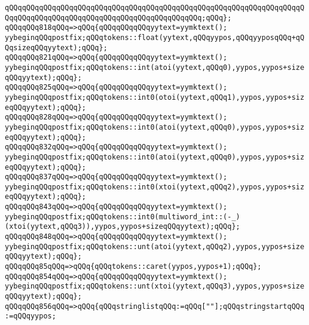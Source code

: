 \verb|qQQqqQQqqQQqqQQqqQQqqQQqqQQqqQQqqQQqqQQqqQQqqQQqqQQqqQQqqQQqqQQqqQQqqQQqqQQqqQQqqQQqqQQqqQQqqQQqqQQqqQQqqQQqqQQqqQQq;qQQq};|\newline
\verb|qQQqqQQq818qQQq=>qQQq{qQQqqQQqqQQqyytext=yymktext();|\newline
\verb|yybeginqQQqpostfix;qQQqtokens::float(yytext,qQQqyypos,qQQqyyposqQQq+qQQqsizeqQQqyytext);qQQq};|\newline
\verb|qQQqqQQq821qQQq=>qQQq{qQQqqQQqqQQqyytext=yymktext();|\newline
\verb|yybeginqQQqpostfix;qQQqtokens::int(atoi(yytext,qQQq0),yypos,yypos+sizeqQQqyytext);qQQq};|\newline
\verb|qQQqqQQq825qQQq=>qQQq{qQQqqQQqqQQqyytext=yymktext();|\newline
\verb|yybeginqQQqpostfix;qQQqtokens::int0(otoi(yytext,qQQq1),yypos,yypos+sizeqQQqyytext);qQQq};|\newline
\verb|qQQqqQQq828qQQq=>qQQq{qQQqqQQqqQQqyytext=yymktext();|\newline
\verb|yybeginqQQqpostfix;qQQqtokens::int0(atoi(yytext,qQQq0),yypos,yypos+sizeqQQqyytext);qQQq};|\newline
\verb|qQQqqQQq832qQQq=>qQQq{qQQqqQQqqQQqyytext=yymktext();|\newline
\verb|yybeginqQQqpostfix;qQQqtokens::int0(atoi(yytext,qQQq0),yypos,yypos+sizeqQQqyytext);qQQq};|\newline
\verb|qQQqqQQq837qQQq=>qQQq{qQQqqQQqqQQqyytext=yymktext();|\newline
\verb|yybeginqQQqpostfix;qQQqtokens::int0(xtoi(yytext,qQQq2),yypos,yypos+sizeqQQqyytext);qQQq};|\newline
\verb|qQQqqQQq843qQQq=>qQQq{qQQqqQQqqQQqyytext=yymktext();|\newline
\verb|yybeginqQQqpostfix;qQQqtokens::int0(multiword_int::(-_)(xtoi(yytext,qQQq3)),yypos,yypos+sizeqQQqyytext);qQQq};|\newline
\verb|qQQqqQQq848qQQq=>qQQq{qQQqqQQqqQQqyytext=yymktext();|\newline
\verb|yybeginqQQqpostfix;qQQqtokens::unt(atoi(yytext,qQQq2),yypos,yypos+sizeqQQqyytext);qQQq};|\newline
\verb|qQQqqQQq85qQQq=>qQQq{qQQqtokens::caret(yypos,yypos+1);qQQq};|\newline
\verb|qQQqqQQq854qQQq=>qQQq{qQQqqQQqqQQqyytext=yymktext();|\newline
\verb|yybeginqQQqpostfix;qQQqtokens::unt(xtoi(yytext,qQQq3),yypos,yypos+sizeqQQqyytext);qQQq};|\newline
\verb|qQQqqQQq856qQQq=>qQQq{qQQqstringlistqQQq:=qQQq[""];qQQqstringstartqQQq:=qQQqyypos;|\newline
